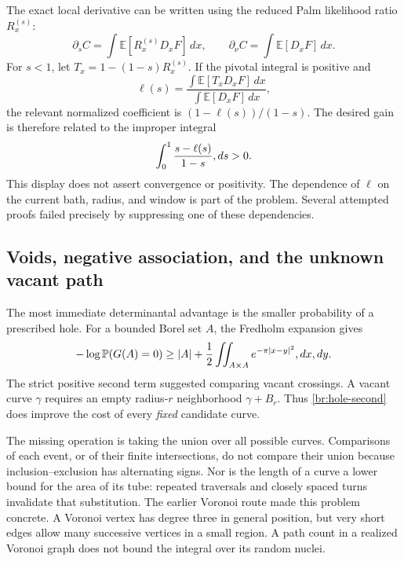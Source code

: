 \documentclass[11pt,a4paper]{article}
\theoremstyle{definition}
\theoremstyle{remark}
\numberwithin{equation}{section}
\begin{document}
The exact local derivative can be written using the reduced Palm
likelihood ratio $R_x^{(s)}$:
\[
 \partial_s C=\int\mathbb E[R_x^{(s)}D_xF]\,dx,
 \qquad \partial_\nu C=\int\mathbb E[D_xF]\,dx.
\]
For $s<1$, let $T_x=1-(1-s)R_x^{(s)}$.  If the pivotal integral is
positive and
\[
 \ell(s)=
 \frac{\int\mathbb E[T_xD_xF]\,dx}
      {\int\mathbb E[D_xF]\,dx},
\]
the relevant normalized coefficient is $(1-\ell(s))/(1-s)$.  The desired
gain is therefore related to the improper integral
\begin{equation}
 \int_0^1\frac{s-\ell(s)}{1-s}\\,ds>0.
 \label{br:averaged-gap}
\end{equation}
This display does not assert convergence or positivity.  The dependence
of $\ell$ on the current bath, radius, and window is part of the problem.
Several attempted proofs failed precisely by suppressing one of these
dependencies.

\subsection{Voids, negative association, and the unknown vacant path}
\label{br:void}

The most immediate determinantal advantage is the smaller probability of
a prescribed hole.  For a bounded Borel set $A$, the Fredholm expansion
gives
\begin{equation}
 -\log\mathbb P(G(A)=0)
 \geq |A|+\frac12\iint_{A\times A}e^{-\pi|x-y|^2}\\,dx\\,dy.
 \label{br:hole-second}
\end{equation}
The strict positive second term suggested comparing vacant crossings.
A vacant curve $\gamma$ requires an empty radius-$r$ neighborhood
$\gamma+B_r$.  Thus \eqref{br:hole-second} does improve the cost of every
\emph{fixed} candidate curve.

The missing operation is taking the union over all possible curves.
Comparisons of each event, or of their finite intersections, do not
compare their union because inclusion--exclusion has alternating signs.
Nor is the length of a curve a lower bound for the area of its tube:
repeated traversals and closely spaced turns invalidate that substitution.
The earlier Voronoi route made this problem concrete.  A Voronoi vertex
has degree three in general position, but very short edges allow many
successive vertices in a small region.  A path count in a realized
Voronoi graph does not bound the integral over its random nuclei.
\end{document}
